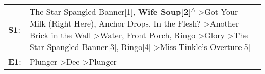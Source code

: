 \begin{supertabular}{p{0.03\textwidth}p{0.92\textwidth}}
 \textbf{S1}:  &  The Star Spangled Banner[1]\textsuperscript{}, \enspace \textbf{Wife Soup[2]\textsuperscript{$\wedge$}} \textgreater \enspace Got Your Milk (Right Here)\textsuperscript{}, \enspace Anchor Drops\textsuperscript{}, \enspace In the Flesh?\textsuperscript{} \textgreater \enspace Another Brick in the Wall\textsuperscript{} \textgreater \enspace Water\textsuperscript{}, \enspace Front Porch\textsuperscript{}, \enspace Ringo\textsuperscript{} \textgreater \enspace Glory\textsuperscript{} \textgreater \enspace The Star Spangled Banner[3]\textsuperscript{}, \enspace Ringo[4]\textsuperscript{} \textgreater \enspace Miss Tinkle's Overture[5]\textsuperscript{}  \enspace  \\
 \textbf{E1}:  &                                                                                                                                                                                                                                                                                                                                                                                                                                                                                                                                                             Plunger\textsuperscript{} \textgreater \enspace Dee\textsuperscript{} \textgreater \enspace Plunger\textsuperscript{}  \enspace  \\
\end{supertabular}
